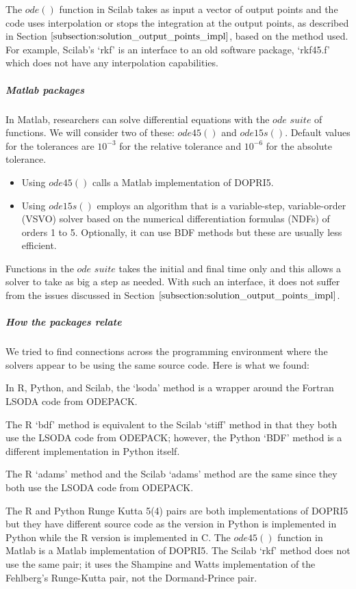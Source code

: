 The $ode()$ function in Scilab takes as input a vector of output points and the code uses interpolation or stops the integration at the output points, as described in Section $\ref{subsection:solution_output_points_impl}$, based on the method used. For example, Scilab's `rkf' is an interface to an old software package, `rkf45.f' which does not have any interpolation capabilities.

\subparagraph{Matlab packages}
In Matlab, researchers can solve differential equations with the $ode$ $suite$ \cite{shampine1997matlab} of functions. We will consider two of these: $ode45()$ and $ode15s()$.
Default values for the tolerances are $10^{-3}$ for the relative tolerance and $10^{-6}$ for the absolute tolerance.

\begin{itemize}
\item Using $ode45()$ calls a Matlab implementation of DOPRI5.

\item Using $ode15s()$ employs an algorithm that is a variable-step, variable-order (VSVO) solver based on the numerical differentiation formulas (NDFs) \cite{shampine1997matlab} of orders 1 to 5. Optionally, it can use BDF methods but these are usually less efficient.
\end{itemize}

Functions in the $ode$ $suite$ takes the initial and final time only and this allows a solver to take as big a step as needed. With such an interface, it does not suffer from the issues discussed in Section $\ref{subsection:solution_output_points_impl}$. 

\subparagraph{How the packages relate}
We tried to find connections across the programming environment where the solvers appear to be using the same source code.
Here is what we found:

In R, Python, and Scilab, the `lsoda' method is a wrapper around the Fortran LSODA code from ODEPACK.

The R `bdf' method is equivalent to the Scilab `stiff' method in that they both use the LSODA code from ODEPACK; however, the Python `BDF' method is a different implementation in Python itself.

The R `adams' method and the Scilab `adams' method are the same since they both use the LSODA code from ODEPACK.

The R and Python Runge Kutta 5(4) pairs are both implementations of DOPRI5 but they have different source code as the version in Python is implemented in Python while the R version is implemented in C. The $ode45()$ function in Matlab is a Matlab implementation of DOPRI5. The Scilab `rkf' method does not use the same pair; it uses the Shampine and Watts implementation of the Fehlberg's Runge-Kutta pair, not the Dormand-Prince pair. 


